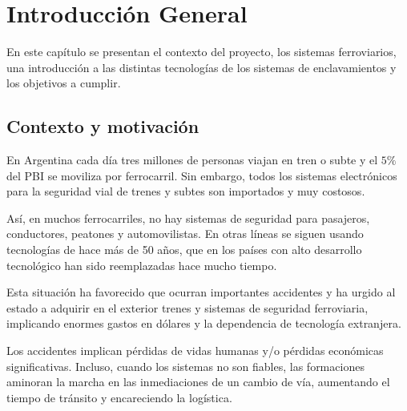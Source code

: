 
\chapter{Introducción General} %

\label{Chapter1} %
\label{IntroGeneral}


\newcommand{\keyword}[1]{\textbf{#1}}
\newcommand{\tabhead}[1]{\textbf{#1}}
\newcommand{\code}[1]{\texttt{#1}}
\newcommand{\file}[1]{\texttt{\bfseries#1}}
\newcommand{\option}[1]{\texttt{\itshape#1}}
\newcommand{\grados}{$^{\circ}$}


En este capítulo se presentan el contexto del proyecto, los sistemas ferroviarios, una introducción a las distintas tecnologías de los sistemas de enclavamientos y los objetivos a cumplir.

		
	\section{Contexto y motivación}
	
		En Argentina cada día tres millones de personas viajan en tren o subte y el $5\%$ del PBI se moviliza por ferrocarril\citep{CNRT}. Sin embargo, todos los sistemas electrónicos para la seguridad vial de trenes y subtes son importados y muy costosos. 

		Así, en muchos ferrocarriles, no hay sistemas de seguridad para pasajeros, conductores, peatones y automovilistas. En otras líneas se siguen usando tecnologías de hace más de 50 años, que en los países con alto desarrollo tecnológico han sido reemplazadas hace mucho tiempo\citep{LIBRO1}.

		Esta situación ha favorecido que ocurran importantes accidentes \citep{WIKI1} y ha urgido al estado a adquirir en el exterior trenes y sistemas de seguridad ferroviaria, implicando enormes gastos en dólares y la dependencia de tecnología extranjera\citep{GOB1}.

		Los accidentes implican pérdidas de vidas humanas y/o pérdidas económicas significativas. Incluso, cuando los sistemas no son fiables, las formaciones aminoran la marcha en las inmediaciones de un cambio de vía, aumentando el tiempo de tránsito y encareciendo la logística.
		
